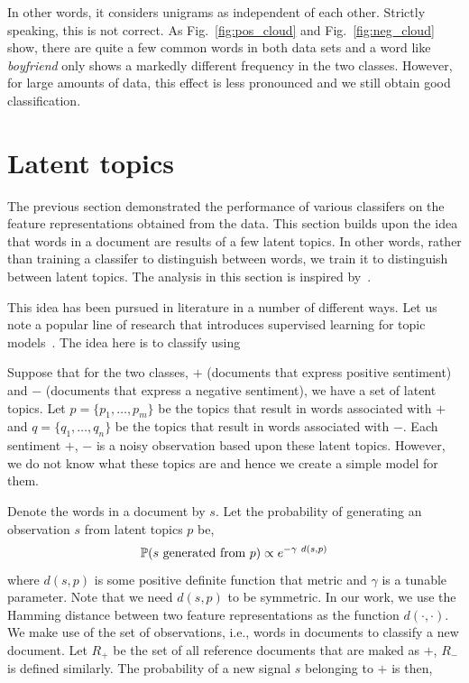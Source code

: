 \documentclass[11pt, letterpaper, conference, final, twocolumn]{ieeeconf}
\begin{document}
In other words, it considers unigrams as independent of each other. Strictly speaking, this is not correct. As Fig.~\ref{fig:pos_cloud} and Fig.~\ref{fig:neg_cloud} show, there are quite a few common words in both data sets and a word like \emph{boyfriend} only shows a markedly different frequency in the two classes. However, for large amounts of data, this effect is less pronounced and we still obtain good classification.

\section{Latent topics}
\label{sec:latent}

The previous section demonstrated the performance of various classifers on the feature representations obtained from the data. This section builds upon the idea that words in a document are results of a few latent topics. In other words, rather than training a classifer to distinguish between words, we train it to distinguish between latent topics. The analysis in this section is inspired by~\cite{nikolov2012nonparametric}.

This idea has been pursued in literature in a number of different ways. Let us note a popular line of research that introduces supervised learning for topic models~\cite{blei2010supervised}. The idea here is to classify using 

Suppose that for the two classes, $+$ (documents that express positive sentiment) and $-$ (documents that express a negative sentiment), we have a set of latent topics. Let $p = \{ p_1, \ldots, p_m \}$ be the topics that result in words associated with $+$ and $q = \{ q_1, \ldots, q_n \}$ be the topics that result in words associated with $-$. Each sentiment $+$, $-$ is a noisy observation based upon these latent topics. However, we do not know what these topics are and hence we create a simple model for them.

Denote the words in a document by $s$. Let the probability of generating an observation $s$ from latent topics $p$ be,
$$
\mathbb{P}(s\ \textrm{generated from}\ p) \propto e^{-\gamma\ d(s, p)}
$$
where $d(s,p)$ is some positive definite function that metric and $\gamma$ is a tunable parameter. Note that we need $d(s,p)$ to be symmetric. In our work, we use the Hamming distance between two feature representations as the function $d(\cdot, \cdot)$. We make use of the set of observations, i.e., words in documents to classify a new document. Let $R_+$ be the set of all reference documents that are maked as $+$, $R_-$ is defined similarly. The probability of a new signal $s$ belonging to $+$ is then,
\end{document}
